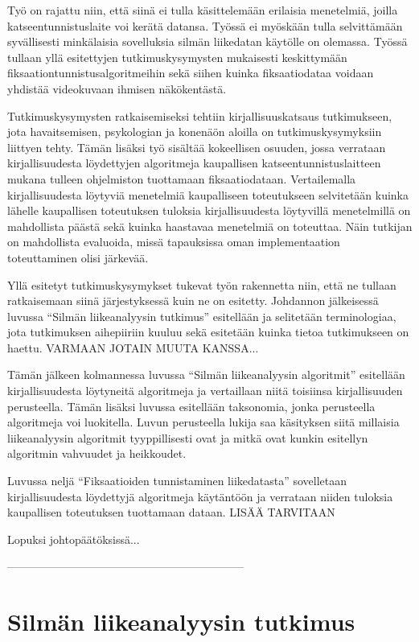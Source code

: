 Työ on rajattu niin, että siinä ei tulla käsittelemään erilaisia menetelmiä, joilla katseentunnistuslaite voi kerätä datansa. Työssä ei myöskään tulla selvittämään syvällisesti minkälaisia sovelluksia silmän liikedatan käytölle on olemassa. Työssä tullaan yllä esitettyjen tutkimuskysymysten mukaisesti keskittymään fiksaationtunnistusalgoritmeihin sekä siihen kuinka fiksaatiodataa voidaan yhdistää videokuvaan ihmisen näkökentästä.

Tutkimuskysymysten ratkaisemiseksi tehtiin kirjallisuuskatsaus tutkimukseen, jota havaitsemisen, psykologian ja konenäön aloilla on tutkimuskysymyksiin liittyen tehty. Tämän lisäksi työ sisältää kokeellisen osuuden, jossa verrataan kirjallisuudesta löydettyjen algoritmeja kaupallisen katseentunnistuslaitteen mukana tulleen ohjelmiston tuottamaan fiksaatiodataan. Vertailemalla kirjallisuudesta löytyviä menetelmiä kaupalliseen toteutukseen selvitetään kuinka lähelle kaupallisen toteutuksen tuloksia kirjallisuudesta löytyvillä menetelmillä on mahdollista päästä sekä kuinka haastavaa menetelmiä on toteuttaa. Näin tutkijan on mahdollista evaluoida, missä tapauksissa oman implementaation toteuttaminen olisi järkevää.

Yllä esitetyt tutkimuskysymykset tukevat työn rakennetta niin, että ne tullaan ratkaisemaan siinä järjestyksessä kuin ne on esitetty. Johdannon jälkeisessä luvussa ``Silmän liikeanalyysin tutkimus''  esitellään ja selitetään terminologiaa, jota tutkimuksen aihepiiriin kuuluu sekä esitetään kuinka tietoa tutkimukseen on haettu. VARMAAN JOTAIN MUUTA KANSSA...

Tämän jälkeen kolmannessa luvussa ``Silmän liikeanalyysin algoritmit''  esitellään kirjallisuudesta löytyneitä algoritmeja ja vertaillaan niitä toisiinsa kirjallisuuden perusteella. Tämän lisäksi luvussa esitellään taksonomia, jonka perusteella algoritmeja voi luokitella. Luvun perusteella lukija saa käsityksen siitä millaisia liikeanalyysin algoritmit tyyppillisesti ovat ja mitkä ovat kunkin esitellyn algoritmin vahvuudet ja heikkoudet.

Luvussa neljä ``Fiksaatioiden tunnistaminen liikedatasta''  sovelletaan kirjallisuudesta löydettyjä algoritmeja käytäntöön ja verrataan niiden tuloksia kaupallisen toteutuksen tuottamaan dataan. LISÄÄ TARVITAAN

Lopuksi johtopäätöksissä...
 

---------------------------------------------------------------
\section{Silmän liikeanalyysin tutkimus}

